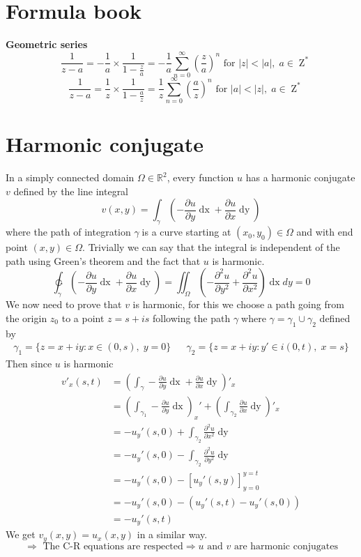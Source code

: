 \documentclass{article}
\newcommand{\R}{\mathbb{R}}
\newcommand{\GG}{$ \gamma \;$}
\begin{document}
\pagebreak
\appendix


\section{Formula book}
\textbf{Geometric series}
\[ \quad \frac{1}{z-a} = -\frac{1}{a}\times\frac{1}{1-\frac{z}{a}} = -\frac{1}{a} \sum_{n=0}^{\infty} \left( \frac{z}{a} \right)^n \text{ for } |z| < |a|, \; a \in \operatorname{Z}^* \]
\[ \quad \frac{1}{z-a} = \frac{1}{z}\times\frac{1}{1-\frac{a}{z}} = \frac{1}{z} \sum_{n=0}^{\infty} \left( \frac{a}{z} \right)^n \text{ for } |a| < |z|, \; a \in \operatorname{Z}^* \]

\section{Harmonic conjugate}
In a simply connected domain $\Omega \in \R^2$, every function $u$ has a harmonic conjugate $v$ defined
by the line integral
\[ v(x,y) = \int_\gamma \left( -\frac{\partial u}{\partial y}\mathop{dx} + \frac{\partial u }{\partial x}\mathop{dy}\right) \]
where the path of integration \GG is a curve starting at $(x_0,y_0) \in \Omega$ and with end point $(x,y) \in \Omega$.
Trivially we can say that the integral is independent of the path using Green's theorem and the fact that $u$ is harmonic.
\[ 
    \ointctrclockwise_\gamma \left( -\frac{\partial u}{\partial y}\mathop{dx} + \frac{\partial u }{\partial x}\mathop{dy}\right) 
    = \iint_\Omega \left( -\frac{\partial^2 u}{\partial y^2} + \frac{\partial^2 u}{\partial x^2} \right)\mathop{dx}{dy}
    = 0
\]
We now need to prove that $v$ is harmonic, for this we choose a path going from the origin $z_0$ to
a point $z = s+is$ following the path \GG where $\gamma = \gamma_1 \cup \gamma_2$ defined by
\begin{align*}
    \gamma_1 = \{ z = x+iy: x \in (0, s),\; y = 0 \} && \gamma_2 = \{ z = x+iy: y'\in i(0, t), \; x = s\}
\end{align*}
Then since $u$ is harmonic
\begin{align*}
    v'_x(s,t)
        &= \left( \int_\gamma -\frac{\partial u}{\partial y}\mathop{dx} + \frac{\partial u }{\partial x}\mathop{dy}\right)'_x\\
        &= \left( \int_{\gamma_1} -\frac{\partial u}{\partial y}\mathop{dx}\right)_x' + \left( \int_{\gamma_2} \frac{\partial u }{\partial x}\mathop{dy}\right)'_x\\
        &= -u_y'(s,0) + \int_{\gamma_2} \frac{\partial^2 u}{\partial x^2}\mathop{dy}\\
        &= -u_y'(s,0) - \int_{\gamma_2} \frac{\partial^2 u}{\partial y^2}\mathop{dy}\\
        &= -u_y'(s,0) - \left[u_y'(s, y)\right]_{y=0}^{y=t}\\
        &= -u_y'(s, 0) - (u_y'(s, t) - u_y'(s, 0))\\
        &= -u_y'(s,t)
\end{align*}
We get $v_y(x,y) = u_x(x,y)$ in a similar way.
\[ \Rightarrow \text{ The C-R equations are respected} \Rightarrow u \text{ and } v \text{ are harmonic conjugates} \]

\end{document}
